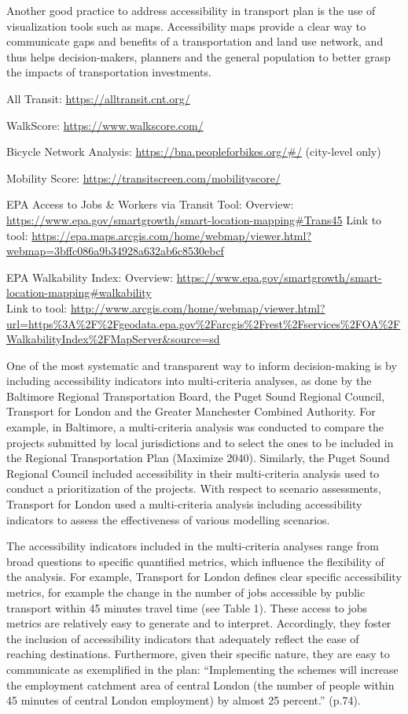 \documentclass[12pt,]{article}
\begin{document}
Another good practice to address accessibility in transport plan is the
use of visualization tools such as maps. Accessibility maps provide a
clear way to communicate gaps and benefits of a transportation and land
use network, and thus helps decision-makers, planners and the general
population to better grasp the impacts of transportation investments.

All Transit: \url{https://alltransit.cnt.org/}

WalkScore: \url{https://www.walkscore.com/}

Bicycle Network Analysis: \url{https://bna.peopleforbikes.org/\#/}
(city-level only)

Mobility Score: \url{https://transitscreen.com/mobilityscore/}

EPA Access to Jobs \& Workers via Transit Tool: Overview:
\url{https://www.epa.gov/smartgrowth/smart-location-mapping\#Trans45}
Link to tool:
\url{https://epa.maps.arcgis.com/home/webmap/viewer.html?webmap=3bffc086a9b34928a632ab6c8530ebcf}

EPA Walkability Index: Overview:
\url{https://www.epa.gov/smartgrowth/smart-location-mapping\#walkability}\\
Link to tool:
\url{http://www.arcgis.com/home/webmap/viewer.html?url=https\%3A\%2F\%2Fgeodata.epa.gov\%2Farcgis\%2Frest\%2Fservices\%2FOA\%2FWalkabilityIndex\%2FMapServer\&source=sd}

One of the most systematic and transparent way to inform decision-making
is by including accessibility indicators into multi-criteria analyses,
as done by the Baltimore Regional Transportation Board, the Puget Sound
Regional Council, Transport for London and the Greater Manchester
Combined Authority. For example, in Baltimore, a multi-criteria analysis
was conducted to compare the projects submitted by local jurisdictions
and to select the ones to be included in the Regional Transportation
Plan (Maximize 2040). Similarly, the Puget Sound Regional Council
included accessibility in their multi-criteria analysis used to conduct
a prioritization of the projects. With respect to scenario assessments,
Transport for London used a multi-criteria analysis including
accessibility indicators to assess the effectiveness of various
modelling scenarios.

The accessibility indicators included in the multi-criteria analyses
range from broad questions to specific quantified metrics, which
influence the flexibility of the analysis. For example, Transport for
London defines clear specific accessibility metrics, for example the
change in the number of jobs accessible by public transport within 45
minutes travel time (see Table 1). These access to jobs metrics are
relatively easy to generate and to interpret. Accordingly, they foster
the inclusion of accessibility indicators that adequately reflect the
ease of reaching destinations. Furthermore, given their specific nature,
they are easy to communicate as exemplified in the plan: ``Implementing
the schemes will increase the employment catchment area of central
London (the number of people within 45 minutes of central London
employment) by almost 25 percent.'' (p.74).
\end{document}
